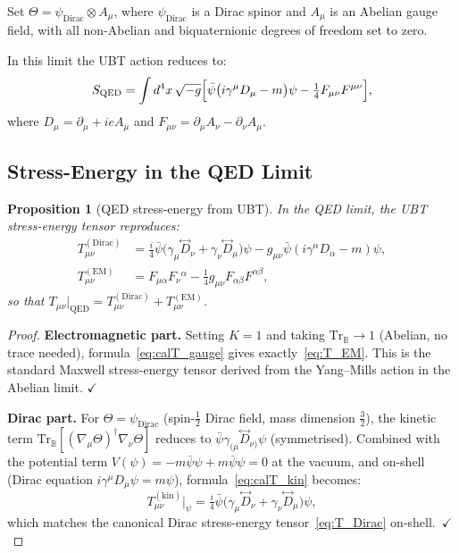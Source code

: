 \documentclass[12pt]{article}
\newtheorem{proposition}[definition]{Proposition}
\newcommand{\Tr}{\mathrm{Tr}}
\begin{document}
Set $\Theta = \psi_{\mathrm{Dirac}}\otimes A_\mu$, where
$\psi_{\mathrm{Dirac}}$ is a Dirac spinor and $A_\mu$ is an Abelian gauge
field, with all non-Abelian and biquaternionic degrees of freedom set to zero.

In this limit the UBT action reduces to:
\begin{equation}
  S_{\mathrm{QED}} = \int d^4x\,\sqrt{-g}\Bigl[
    \bar{\psi}\bigl(i\gamma^\mu D_\mu - m\bigr)\psi
    - \tfrac{1}{4}F_{\mu\nu}F^{\mu\nu}
  \Bigr],
\end{equation}
where $D_\mu = \partial_\mu + ieA_\mu$ and $F_{\mu\nu} = \partial_\mu A_\nu
- \partial_\nu A_\mu$.

\subsection{Stress-Energy in the QED Limit}

\begin{proposition}[QED stress-energy from UBT]
\label{prop:qed_limit}
In the QED limit, the UBT stress-energy tensor reproduces:
\begin{align}
  T^{(\mathrm{Dirac})}_{\mu\nu}
    &= \tfrac{i}{4}\bar{\psi}\bigl(\gamma_\mu\overset{\leftrightarrow}{D}_\nu
       + \gamma_\nu\overset{\leftrightarrow}{D}_\mu\bigr)\psi
       - g_{\mu\nu}\bar{\psi}(i\gamma^\alpha D_\alpha - m)\psi,
       \label{eq:T_Dirac} \\
  T^{(\mathrm{EM})}_{\mu\nu}
    &= F_{\mu\alpha}F_\nu{}^\alpha - \tfrac{1}{4}g_{\mu\nu}F_{\alpha\beta}F^{\alpha\beta},
       \label{eq:T_EM}
\end{align}
so that $T_{\mu\nu}\big|_{\mathrm{QED}} = T^{(\mathrm{Dirac})}_{\mu\nu}
+ T^{(\mathrm{EM})}_{\mu\nu}$.
\end{proposition}

\begin{proof}
\textbf{Electromagnetic part.}
Setting $K=1$ and taking $\Tr_{\mathbb{B}} \to 1$ (Abelian, no trace needed),
formula~\eqref{eq:calT_gauge} gives exactly~\eqref{eq:T_EM}.
This is the standard Maxwell stress-energy tensor derived from the
Yang--Mills action in the Abelian limit. $\checkmark$

\textbf{Dirac part.}
For $\Theta = \psi_{\mathrm{Dirac}}$ (spin-$\tfrac{1}{2}$ Dirac field,
mass dimension $\tfrac{3}{2}$), the kinetic term
$\Tr_{\mathbb{B}}[(\nabla_\mu\Theta)^\dagger\nabla_\nu\Theta]$ reduces to
$\bar{\psi}\gamma_{(\mu}\overset{\leftrightarrow}{D}_{\nu)}\psi$
(symmetrised).
Combined with the potential term $V(\psi) = -m\bar{\psi}\psi + m\bar{\psi}\psi
= 0$ at the vacuum, and on-shell (Dirac equation
$i\gamma^\mu D_\mu\psi = m\psi$), formula~\eqref{eq:calT_kin} becomes:
\begin{equation}
  T^{(\mathrm{kin})}_{\mu\nu}\big|_{\psi}
  = \tfrac{i}{4}\bar{\psi}\bigl(\gamma_\mu\overset{\leftrightarrow}{D}_\nu
    + \gamma_\nu\overset{\leftrightarrow}{D}_\mu\bigr)\psi,
\end{equation}
which matches the canonical Dirac stress-energy tensor~\eqref{eq:T_Dirac}
on-shell.~$\checkmark$
\end{proof}
\end{document}
